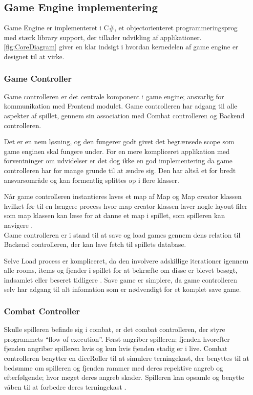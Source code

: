 \subsection{Game Engine implementering}
Game Engine er implementeret i C\#, et objectorienteret programmeringsprog
med stærk library support, der tillader udvikling af applikationer. 
\autoref{fig:CoreDiagram} giver en klar indsigt i hvordan kernedelen af
game engine er designet til at virke. 

\subsubsection{Game Controller}
Game controlleren er det centrale komponent i game engine; ansvarlig for 
kommunikation med Frontend modulet. Game controlleren har adgang til alle
aspekter af spillet, gennem sin association med Combat controlleren og 
Backend controlleren.

\noindent Det er en nem løsning, og den fungerer godt givet det begrænsede scope som 
game enginen skal fungere under.
For en mere kompliceret applikation med forventninger om udvidelser er det
dog ikke en god implementering da game controlleren har for mange grunde
til at ændre sig. Den har altså et for bredt ansvarsområde og kan formentlig
splittes op i flere klasser.

\noindent Når game controlleren instantieres laves et map af Map og Map creator klassen
hvilket før til en længere process hvor map creator klassen laver nogle
layout filer som map klassen kan læse for at danne et map i spillet, som 
spilleren kan navigere \parencite[Section 11.3.2][]{TekniskBilag}.\\

\noindent Game controlleren er i stand til at save og load games gennem 
dens relation til Backend controlleren, der kan lave fetch til spillets
database.

\noindent Selve Load process er kompliceret, da den involvere adskillige iterationer
igennem alle rooms, items og fjender i spillet for at bekræfte om disse er
blevet besøgt, indsamlet eller beseret tidligere \parencite[Section 11.3.1]
[Figure 55]{TekniskBilag}.
Save game er simplere, da game controlleren selv har adgang til alt infomation
som er nødvendigt for et komplet save game.

\subsubsection{Combat Controller}
Skulle spilleren befinde sig i combat, er det combat controlleren, der styre programmets
``flow of execution''. Først angriber spilleren; fjenden hvorefter fjenden angriber spilleren
hvis og kun hvis fjenden stadig er i live. Combat controlleren benytter en diceRoller til
at simulere terningekast, der benyttes til at bedømme om spilleren og fjenden rammer med
deres repektive angreb og efterfølgende; hvor meget deres angreb skader. Spilleren kan opsamle
og benytte våben til at forbedre deres terningekast \parencite[Section 10.3.2][]{TekniskBilag}. 

